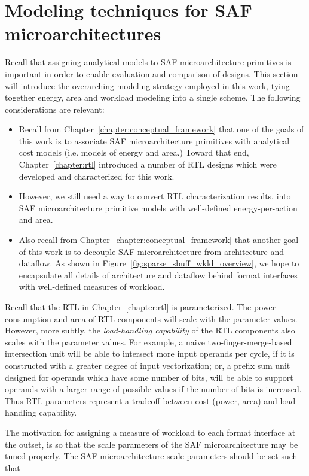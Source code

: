 \chapter{Modeling techniques for SAF microarchitectures}
\label{chapter:modeling}

Recall that assigning analytical models to SAF microarchitecture primitives is important in order to enable evaluation and comparison of designs. This section will introduce the overarching modeling strategy employed in this work, tying together energy, area and workload modeling into a single scheme. The following considerations are relevant:

\begin{itemize}
    \item Recall from Chapter~\ref{chapter:conceptual_framework} that one of the goals of this work is to associate SAF microarchitecture primitives with analytical cost models (i.e. models of energy and area.) Toward that end, Chapter~\ref{chapter:rtl} introduced a number of RTL designs which were developed and characterized for this work.
    \item However, we still need a way to convert RTL characterization results, into SAF microarchitecture primitive models with well-defined energy-per-action and area.
    \item Also recall from Chapter~\ref{chapter:conceptual_framework} that another goal of this work is to decouple SAF microarchitecture from architecture and dataflow. As shown in Figure~\ref{fig:sparse_sbuff_wkld_overview}, we hope to encapsulate all details of architecture and dataflow behind format interfaces with well-defined measures of workload.
\end{itemize}

Recall that the RTL in Chapter~\ref{chapter:rtl} is parameterized. The power-consumption and area of RTL components will scale with the parameter values. However, more subtly, the \textit{load-handling capability} of the RTL components also scales with the parameter values. For example, a naive two-finger-merge-based intersection unit will be able to intersect more input operands per cycle, if it is constructed with a greater degree of input vectorization; or, a prefix sum unit designed for operands which have some number of bits, will be able to support operands with a larger range of possible values if the number of bits is increased. Thus RTL parameters represent a tradeoff between cost (power, area) and load-handling capability.

The motivation for assigning a measure of workload to each format interface at the outset, is so that the scale parameters of the SAF microarchitecture may be tuned properly. The SAF microarchitecture scale parameters should be set such that

